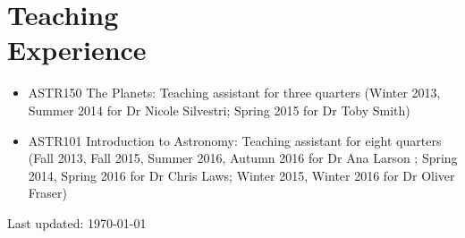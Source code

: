 \documentclass[margin]{res}
\begin{document}
\begin{resume}
\begin{itemize}
\end{itemize}


\section{Teaching \\Experience}
\begin{itemize}   
	
\item ASTR150 The Planets: Teaching assistant for  three quarters (Winter 2013, Summer 2014 for Dr Nicole Silvestri; Spring 2015 for Dr Toby Smith)

\item ASTR101 Introduction to Astronomy: Teaching assistant for  eight quarters (Fall 2013, Fall 2015, Summer 2016, Autumn 2016 for Dr Ana Larson ; Spring 2014, Spring 2016 for Dr Chris Laws; Winter 2015, Winter 2016 for Dr Oliver Fraser) \\
\end{itemize}



\vfill \hfill {\small Last updated: \today}
\end{resume}
\end{document}
